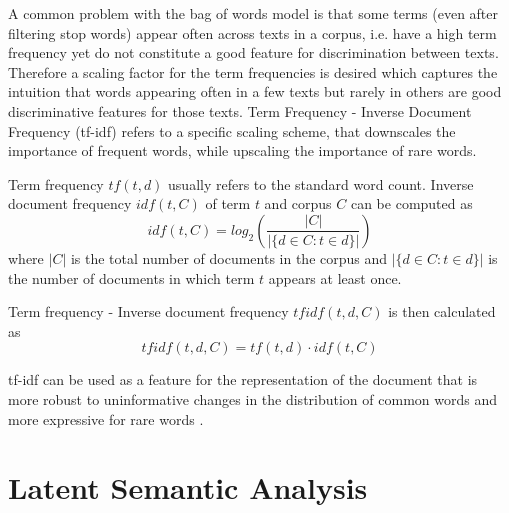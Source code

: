 \documentclass[Thesis.tex]{subfiles}
\begin{document}
A common problem with the bag of words model is that some terms (even
after filtering stop words) appear often across texts in a corpus,
i.e. have a high term frequency yet do not constitute a good feature
for discrimination between texts. Therefore a scaling factor for the
term frequencies is desired which captures the intuition that words
appearing often in a few texts but rarely in others are good discriminative
features for those texts. Term Frequency - Inverse Document Frequency
(tf-idf) refers to a specific scaling scheme, that downscales the
importance of frequent words, while upscaling the importance of rare
words. 

Term frequency $tf(t,d)$ usually refers to the standard word count.
Inverse document frequency $idf(t,C)$ of term $t$ and corpus $C$
can be computed as 
\[
idf(t,C)=log_{2}(\frac{|C|}{|\{d\in C:t\in d\}|})
\]
where $|C|$ is the total number of documents in the corpus and $|\{d\in C:t\in d\}|$
is the number of documents in which term $t$ appears at least once.

Term frequency - Inverse document frequency $tfidf(t,d,C)$ is then
calculated as 
\[
tfidf(t,d,C)=tf(t,d)\cdot idf(t,C)
\]


tf-idf can be used as a feature for the representation of the document
that is more robust to uninformative changes in the distribution of
common words and more expressive for rare words \citep{Manning2008vect}.


\section{Latent Semantic Analysis}
\end{document}
